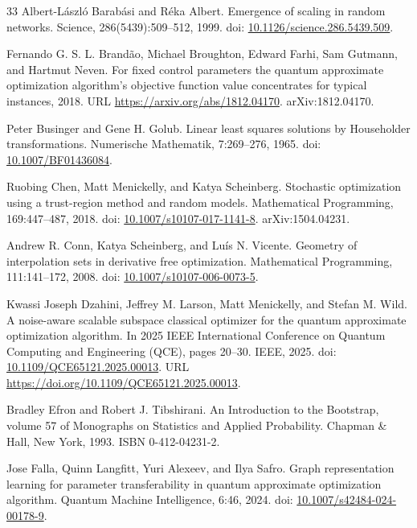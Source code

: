 \documentclass[11pt]{article}
\begin{document}
\FloatBarrier
\begin{thebibliography}{33}
Albert-L\'aszl\'o Barab\'asi and R\'eka Albert. Emergence of scaling in random networks. Science, 286(5439):509--512, 1999. doi: \href{https://doi.org/10.1126/science.286.5439.509}{10.1126/science.286.5439.509}.

Fernando G. S. L. Brand\~ao, Michael Broughton, Edward Farhi, Sam Gutmann, and Hartmut Neven. For fixed control parameters the quantum approximate optimization algorithm's objective function value concentrates for typical instances, 2018. URL \url{https://arxiv.org/abs/1812.04170}. arXiv:1812.04170.

Peter Businger and Gene H. Golub. Linear least squares solutions by Householder transformations. Numerische Mathematik, 7:269--276, 1965. doi: \href{https://doi.org/10.1007/BF01436084}{10.1007/BF01436084}.

Ruobing Chen, Matt Menickelly, and Katya Scheinberg. Stochastic optimization using a trust-region method and random models. Mathematical Programming, 169:447--487, 2018. doi: \href{https://doi.org/10.1007/s10107-017-1141-8}{10.1007/s10107-017-1141-8}. arXiv:1504.04231.

Andrew R. Conn, Katya Scheinberg, and Lu\'is N. Vicente. Geometry of interpolation sets in derivative free optimization. Mathematical Programming, 111:141--172, 2008. doi: \href{https://doi.org/10.1007/s10107-006-0073-5}{10.1007/s10107-006-0073-5}.

Kwassi Joseph Dzahini, Jeffrey M. Larson, Matt Menickelly, and Stefan M. Wild. A noise-aware scalable subspace classical optimizer for the quantum approximate optimization algorithm. In 2025 IEEE International Conference on Quantum Computing and Engineering (QCE), pages 20--30. IEEE, 2025. doi: \href{https://doi.org/10.1109/QCE65121.2025.00013}{10.1109/QCE65121.2025.00013}. URL \url{https://doi.org/10.1109/QCE65121.2025.00013}.

Bradley Efron and Robert J. Tibshirani. An Introduction to the Bootstrap, volume 57 of Monographs on Statistics and Applied Probability. Chapman \& Hall, New York, 1993. ISBN 0-412-04231-2.

Jose Falla, Quinn Langfitt, Yuri Alexeev, and Ilya Safro. Graph representation learning for parameter transferability in quantum approximate optimization algorithm. Quantum Machine Intelligence, 6:46, 2024. doi: \href{https://doi.org/10.1007/s42484-024-00178-9}{10.1007/s42484-024-00178-9}.


\end{thebibliography}
\end{document}

